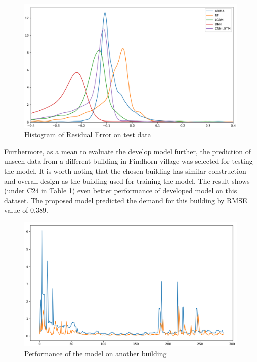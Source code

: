 \documentclass[twocolumn, a4paper,10pt]{article}
\begin{document}
\begin{figure}[ht]
    \centering
    \includegraphics[scale=0.3]{img/pdf.png}
    \caption{Histogram of Residual Error on test data}
    \label{fig:re_error}
\end{figure}

Furthermore, as a mean to evaluate the develop model further, the prediction of unseen data from a different building in Findhorn village was selected for testing the model. It is worth noting that the chosen building has similar construction and overall design as the building used for training the model. The result shows (under C24 in Table 1) even better performance of developed model on this dataset. The proposed model predicted the demand for this building by RMSE value of 0.389.

\begin{figure}[ht]
    \centering
    \includegraphics[scale=0.3]{img/c24_test.png}
    \caption{Performance of the model on another building}
    \label{fig:prediction2}
\end{figure}
\end{document}
